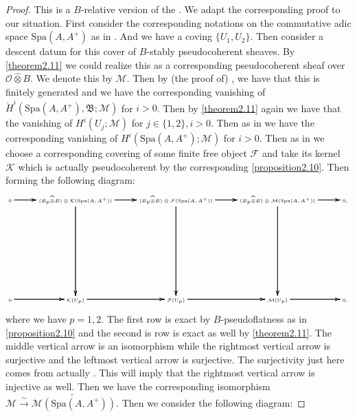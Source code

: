 \documentclass[12pt]{amsart}
\theoremstyle{definition}
\numberwithin{equation}{section}
\begin{document}
\begin{proof}
This is a $B$-relative version of the \cite[Lemma 2.5.4]{KL2}. We adapt the corresponding proof to our situation. First consider the corresponding notations on the commutative adic space $\mathrm{Spa}(A,A^+)$ as in \cite[Lemma 2.4.10]{KL2}. And we have a coving $\{U_1,U_2\}$. Then consider a descent datum for this cover of $B$-stably pseudocoherent sheaves. By \cref{theorem2.11} we could realize this as a corresponding pseudocoherent sheaf over $\mathcal{O}\widehat{\otimes}B$. We denote this by $\mathcal{M}$. Then by (the proof of) \cite[Lemma 6.82]{T2}, we have that this is finitely generated and we have the corresponding vanishing of $\check{H}^i(\mathrm{Spa}(A,A^+),\mathfrak{B};\mathcal{M})$ for $i>0$. Then by \cref{theorem2.11} again we have that the vanishing of $H^i(U_j;\mathcal{M})$ for $j\in \{1,2\},i>0$. Then as in \cite[Lemma 2.5.4]{KL2} we have the corresponding vanishing of $H^i(\mathrm{Spa}(A,A^+);\mathcal{M})$ for $i>0$. Then as in \cite[Lemma 2.5.4]{KL2} we choose a corresponding covering of some finite free object $\mathcal{F}$ and take its kernel $\mathcal{K}$ which is actually pseudocoherent by the corresponding \cref{proposition2.10}. Then forming the following diagram:
\[\tiny
\xymatrix@C+0pc@R+6pc{
0 \ar[r]\ar[r]\ar[r] & (B_p\widehat{\otimes}B)\otimes \mathcal{K}(\mathrm{Spa}(A,A^+))  \ar[r]\ar[r]\ar[r] \ar[d]\ar[d]\ar[d] &(B_p\widehat{\otimes}B)\otimes \mathcal{F}(\mathrm{Spa}(A,A^+))\ar[r]\ar[r]\ar[r] \ar[d]\ar[d]\ar[d] & (B_p\widehat{\otimes}B)\otimes \mathcal{M}(\mathrm{Spa}(A,A^+))\ar[r]\ar[r]\ar[r]  \ar[d]\ar[d]\ar[d]&0,\\
0 \ar[r]\ar[r]\ar[r] &\mathcal{K}(U_p)   \ar[r]\ar[r]\ar[r] &\mathcal{F}(U_p) \ar[r]\ar[r]\ar[r] & \mathcal{M}(U_p) \ar[r]\ar[r]\ar[r] &0,\\
}
\]
where we have $p=1,2$. The first row is exact by $B$-pseudoflatness as in \cref{proposition2.10} and the second is row is exact as well by \cref{theorem2.11}. The middle vertical arrow is an isomorphism while the rightmost vertical arrow is surjective and the leftmost vertical arrow is surjective. The surjectivity just here comes from actually \cite[Lemma 6.82]{T2}. This will imply that the rightmost vertical arrow is injective as well. Then we have the corresponding isomorphism $\mathcal{M}\overset{\sim}{\rightarrow} \widetilde{\mathcal{M}(\mathrm{Spa}(A,A^+))}$. Then we consider the following diagram:


\end{proof}
\end{document}
